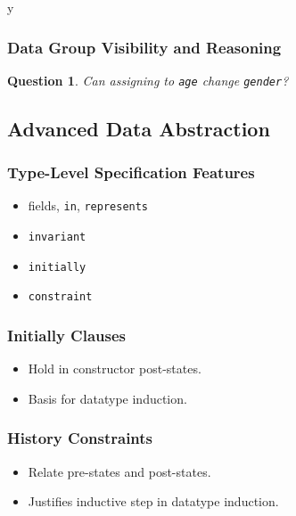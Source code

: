 \if y\MAKEHANDOUTS \documentclass[t,compress,landscape,handout]{beamer}
\newtheorem*{question}{Question}
\begin{document}
\begin{frame}[fragile]
\frametitle{Data Group Visibility and Reasoning}

\begin{question}
Can assigning to \lstinline!age! change \lstinline!gender!?
\end{question}
\end{frame}

\subsection[Advanced]{Advanced Data Abstraction}

\begin{frame}[fragile]
\frametitle{Type-Level Specification Features}

\begin{itemize}
\item
fields, \lstinline!in!, \lstinline!represents!

\item
\lstinline!invariant!

\item
\lstinline!initially!

\item
\lstinline!constraint!
\end{itemize}
\end{frame}

\begin{frame}[fragile]
\frametitle{Initially Clauses}

\begin{itemize}
\item
Hold in constructor post-states.

\item
Basis for datatype induction.
\end{itemize}



\end{frame}

\begin{frame}
\frametitle{History Constraints}
\begin{itemize}
\item
Relate pre-states and post-states.

\item
Justifies inductive step in datatype induction.
\end{itemize}
\end{frame}
\end{document}
